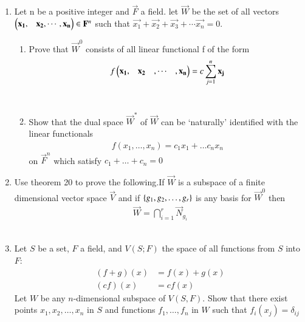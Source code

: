 \renewcommand{\theequation}{\theenumi}
\renewcommand{\thefigure}{\theenumi}
\begin{enumerate}[label=\thesubsection.\arabic*.,ref=\thesubsection.\theenumi]

\item Let n be a positive integer and $\vec{F}$ a field. let $\vec{W}$ be the set of all vectors $\begin{pmatrix}\mathbf{x_1},&\mathbf{x_2},\cdots ,\mathbf{x_n}\end{pmatrix} \in \mathbf{F}^n$ such that $\vec{x_1}+\vec{x_2}+\vec{x_3}+\cdots \vec{x_n} = 0$. 
%
\begin{enumerate}
\item Prove that $\vec{W}^0$ consists of all linear functional f of the form
\begin{align}
f\begin{pmatrix}\mathbf{x_1},&\mathbf{x_2}&,\cdots &,\mathbf{x_n}\end{pmatrix} = c\sum_{j=1}^{n}\mathbf{x_j}
\end{align}
\\
\solution

\item Show that the dual space $\vec{W}^*$ of $\vec{W}$ can be ‘naturally’ identified with the linear functionals
\begin{align}
    f(x_1, \hdots , x_n) = c_1x_1 + \hdots c_nx_n \nonumber
\end{align}
on $\vec{F}^n$ which satisfy $c_1 + \hdots + c_n = 0$
\\
\solution


\end{enumerate}

\item Use theorem 20 to prove the following.If $\vec{W}$ is a subspace of a finite dimensional vector space $\vec{V}$ and if $\left\{g_1,g_2,\hdots,g_r\right\}$ is any basis for $\vec{W}^0$ then
\begin{align}
    \vec{W}=\bigcap_{i=1}^r \vec{N}_{g_i}
\end{align}
%
\\
\solution


\item Let $S$ be a set, $F$ a field, and $V(S;F)$ the space of all functions from $S$ into $F$:
\begin{align}
	\nonumber (f+g)(x) &= f(x) + g(x)\\
	\nonumber (cf)(x) &= cf(x)
\end{align}
Let $W$ be any $n$-dimensional  subspace of $V(S,F)$. Show that there exist points $x_1,x_2, \dots, x_n$ in $S$ and functions $f_1,\dots,f_n$ in $W$ such that $f_i(x_j) = \delta_{ij}$
%
\\
\solution

\end{enumerate}
